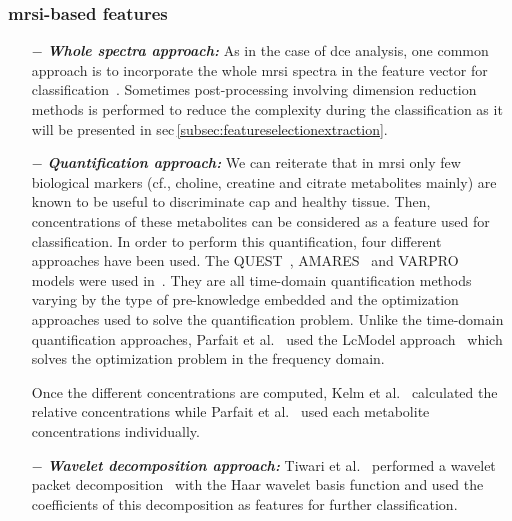 \subsubsection{\ac{mrsi}-based features}

\begin{enumerate}[leftmargin=*]

\item[$-$] \textbf{\textit{Whole spectra approach:}} As in the case of \ac{dce} analysis, one common approach is to incorporate the whole \ac{mrsi} spectra in the feature vector for classification~\cite{Kelm2007,Parfait2012,Tiwari2007,Tiwari2009,Tiwari2013,Tiwari2009a,Tiwari2010,Viswanath2008a,Matulewicz2013}. Sometimes post-processing involving dimension reduction methods is performed to reduce the complexity during the classification as it will be presented in \ac{sec}\,\ref{subsec:featureselectionextraction}.

\item[$-$] \textbf{\textit{Quantification approach:}} We can reiterate that in \ac{mrsi} only few biological markers (cf., choline, creatine and citrate metabolites mainly) are known to be useful to discriminate \ac{cap} and healthy tissue. Then, concentrations of these metabolites can be considered as a feature used for classification. In order to perform this quantification, four different approaches have been used. The QUEST~\cite{Ratiney2005}, AMARES~\cite{Vanhamme1997} and VARPRO~\cite{Coleman1993} models were used in~\cite{Kelm2007}. They are all time-domain quantification methods varying by the type of pre-knowledge embedded and the optimization approaches used to solve the quantification problem. Unlike the time-domain quantification approaches, Parfait et al.~\cite{Parfait2012} used the LcModel approach~\cite{Provencher1993} which solves the optimization problem in the frequency domain.

  Once the different concentrations are computed, Kelm et al.~\cite{Kelm2007} calculated the relative concentrations while Parfait et al.~\cite{Parfait2012} used each metabolite concentrations individually.

\item[$-$] \textbf{\textit{Wavelet decomposition approach:}} Tiwari et al.~\cite{Tiwari2012} performed a wavelet packet decomposition~\cite{Coifman1992} with the Haar wavelet basis function and used the coefficients of this decomposition as features for further classification.

\end{enumerate}

